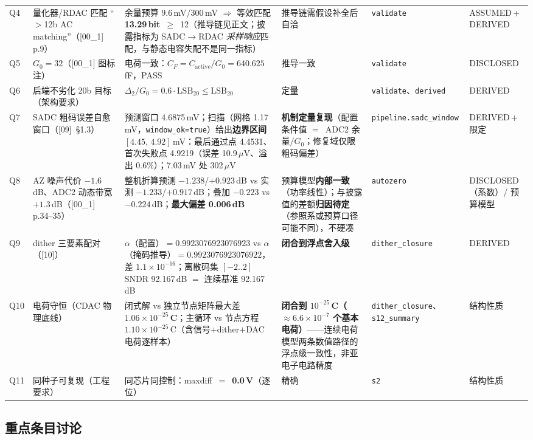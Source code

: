 \documentclass[11pt,a4paper,fontset=fandol]{ctexart}
\newcommand{\rec}[1]{\texttt{#1}}
\newcommand{\uV}{\ensuremath{\,\mu\mathrm{V}}}
\begin{document}
\begin{longtable}{@{}P{0.5cm}P{2.8cm}P{3.8cm}P{2.9cm}P{2.7cm}P{1.7cm}@{}}
Q4 & 量化器/RDAC 匹配 ``$>$12b AC matching''（[00\_1] p.9） & 余量预算 9.6\,mV/300\,mV $\Rightarrow$ 等效匹配 \textbf{13.29\,bit}~$\geq$~12（推导链见正文；披露指标为 SADC$\to$RDAC \emph{采样响应}匹配，与静态电容失配不是同一指标） & 推导链需假设补全后自洽 & \rec{validate} & ASSUMED\,{+}\,DERIVED\\
Q5 & $G_0=32$（[00\_1] 图标注） & 电荷一致：$C_F = C_{\mathrm{active}}/G_0 = 640.625$\,fF，PASS & 推导一致 & \rec{validate} & DISCLOSED\\
Q6 & 后端不劣化 20b 目标（架构要求） & $\Delta_2/G_0 = 0.6\cdot\mathrm{LSB}_{20} \leq \mathrm{LSB}_{20}$ & 定量 & \rec{validate}、\rec{derived} & DERIVED\\
Q7 & SADC 粗码误差自愈窗口（[09]~\S1.3） & 预测窗口 4.6875\,mV；扫描（网格 1.17\,mV，\rec{window\_ok=true}）给出\textbf{边界区间} $[4.45,\,4.92]$\,mV：最后通过点 4.4531、首次失败点 4.9219（误差 10.9\uV、溢出 0.6\%）；7.03\,mV 处 302\uV & \textbf{机制定量复现}（配置条件值 $=$~ADC2 余量$/G_0$；修复域仅限粗码偏差） & \rec{pipeline.sadc\_window} & DERIVED\,{+}\,限定\\
Q8 & AZ 噪声代价 $-1.6$\,dB、ADC2 动态带宽 $+1.3$\,dB（[00\_1] p.34--35） & 整机折算预测 $-1.238$/$+0.923$\,dB vs 实测 $-1.233$/$+0.917$\,dB；叠加 $-0.223$ vs $-0.224$\,dB；\textbf{最大偏差 0.006\,dB} & 预算模型\textbf{内部一致}（功率线性）；与披露值的差额\textbf{归因待定}（参照系或预算口径可能不同），不硬凑 & \rec{autozero} & DISCLOSED（系数）/ 预算模型\\
Q9 & dither 三要素配对（[10]） & $\alpha$（配置）$=0.9923076923076923$ vs $\alpha$（掩码推导）$=0.9923076923076922$，差 $1.1\times10^{-16}$；离散码集 $[-2..2]$ SNDR 92.167\,dB $=$ 连续基准 92.167\,dB & \textbf{闭合到浮点舍入级} & \rec{dither\_closure} & DERIVED\\
Q10 & 电荷守恒（CDAC 物理底线） & 闭式解 vs 独立节点矩阵最大差 \textbf{$1.06\times10^{-25}$\,C}；主循环 vs 节点方程 $1.10\times10^{-25}$\,C（含信号$+$dither$+$DAC 电荷逐样本） & \textbf{闭合到 $10^{-25}$\,C（$\approx6.6\times10^{-7}$ 个基本电荷）}——连续电荷模型两条数值路径的浮点级一致性，非亚电子电路精度 & \rec{dither\_closure}、\rec{s12\_summary} & 结构性质\\
Q11 & 同种子可复现（工程要求） & 同芯片同控制：maxdiff~$=$~\textbf{0.0\,V}（逐位） & 精确 & \rec{s2} & 结构性质\\
\end{longtable}
\endgroup

\subsection{重点条目讨论}
\end{document}
